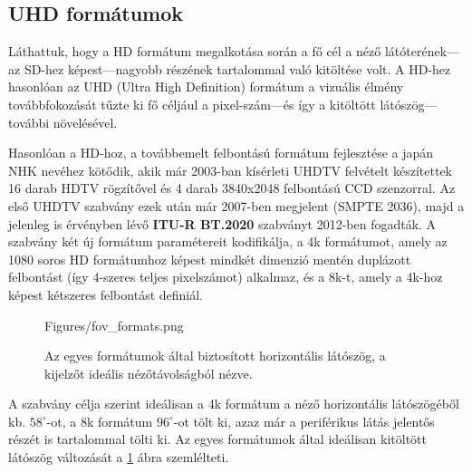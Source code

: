 \subsection{UHD formátumok}

Láthattuk, hogy a HD formátum megalkotása során a fő cél a néző látóterének---az SD-hez képest---nagyobb részének tartalommal való kitöltése volt.
A HD-hez hasonlóan az UHD (Ultra High Definition) formátum a vizuális élmény továbbfokozását tűzte ki fő céljául a pixel-szám---és így a kitöltött látószög---további növelésével.

Hasonlóan a HD-hoz, a továbbemelt felbontású formátum fejlesztése a japán NHK nevéhez kötődik, akik már 2003-ban kísérleti UHDTV felvételt készítettek 16 darab HDTV rögzítővel és 4 darab 3840x2048 felbontású CCD szenzorral.
Az első UHDTV szabvány ezek után már 2007-ben megjelent (SMPTE 2036), majd a jelenleg is érvényben lévő \textbf{ITU-R BT.2020} szabványt 2012-ben fogadták.
A szabvány két új formátum paramétereit kodifikálja, a 4k formátumot, amely az 1080 soros HD formátumhoz képest mindkét dimenzió mentén duplázott felbontást (így 4-szeres teljes pixelszámot) alkalmaz, és a 8k-t, amely a 4k-hoz képest kétszeres felbontást definiál.
\begin{figure}[]
	\centering
	\begin{overpic}[width = 0.85 \columnwidth ]{Figures/fov_formats.png}
	\small
	\end{overpic}
	\caption{Az egyes formátumok által biztosított horizontális látószög, a kijelzőt ideális nézőtávolságból nézve.}
	\label{Fig:fov_formats}
\end{figure}

A szabvány célja szerint ideálisan a 4k formátum a néző horizontális látószögéből kb. $58^{\circ}$-ot, a 8k formátum $96^{\circ}$-ot tölt ki, azaz már a periférikus látás jelentős részét is tartalommal tölti ki.
Az egyes formátumok által ideálisan kitöltött látószög változását a \ref{Fig:fov_formats} ábra szemlélteti.

